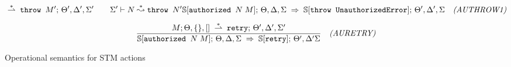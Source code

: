 \begin{figure*}
{\begin{minipage}{\textwidth}
\begin{gather*}
{{     \stackrel{*}{\tddarrow}
     \prg{throw }M';\, \Theta',\Delta',\Sigma'
   \qquad
   \Sigma' \vdash N \stackrel{*}{\leadsto} \prg{throw }N' }
   {\SS[\prg{authorized }N\;M];\,\Theta,\Delta,\Sigma \tdarrow
    \SS[\prg{throw UnauthorizedError}];\,\Theta',\Delta',\Sigma}
  \quad\soslbl{AUTHROW1}
}
\\[5pt]
\new{
\sos{M;\Theta,\emptyset,[]
     \stackrel{*}{\tddarrow}
     \prg{retry};\, \Theta',\Delta',\Sigma'
   }
   {\SS[\prg{authorized }N\;M];\,\Theta,\Delta,\Sigma \tdarrow
    \SS[\prg{retry}];\,\Theta',\Delta'\Sigma}
  \quad\soslbl{AURETRY}
}
%
\end{gather*}

\end{minipage}}
\caption{Operational semantics for STM actions}
\label{fig:sos1}
\end{figure*}

